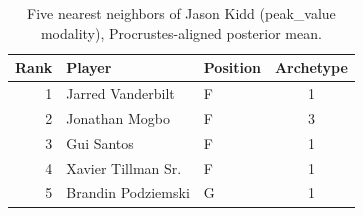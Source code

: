 \begin{table}[htbp]
  \centering\small
  \begin{tabular}{rllc}
    \toprule
    Rank & Player & Position & Archetype \\
    \midrule
    1 & Jarred Vanderbilt & F & 1 \\
    2 & Jonathan Mogbo & F & 3 \\
    3 & Gui Santos & F & 1 \\
    4 & Xavier Tillman Sr. & F & 1 \\
    5 & Brandin Podziemski & G & 1 \\
    \bottomrule
  \end{tabular}
  \caption{Five nearest neighbors of Jason Kidd (peak_value modality), Procrustes-aligned posterior mean.}
  \label{tab:Jason_Kidd_neighbors_peak_value}
\end{table}

